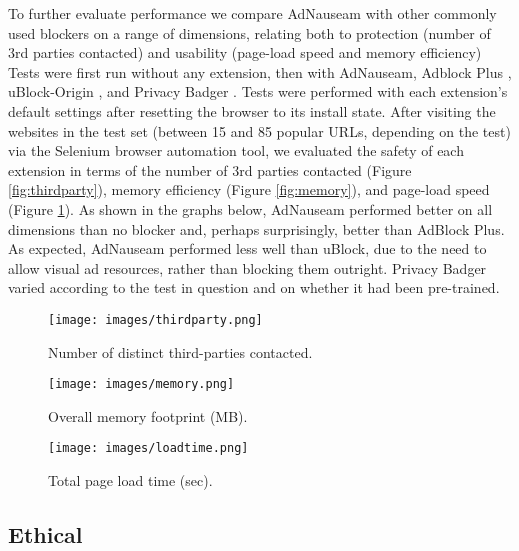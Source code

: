 \documentclass[conference]{IEEEtran}
\begin{document}
To further evaluate performance we compare AdNauseam with other commonly used blockers on a range of dimensions, relating both to protection (number of 3rd parties contacted) and usability (page-load speed and memory efficiency) Tests were first run without any extension, then with AdNauseam, Adblock Plus \cite{AdBlock}, uBlock-Origin \cite{Gorhill}, and Privacy Badger \cite{EFF-0}. Tests were performed with each extension's default settings after resetting the browser to its install state. After visiting the websites in the test set (between 15 and 85 popular URLs, depending on the test) via the Selenium browser automation tool, we evaluated the safety of each extension in terms of the number of 3rd parties contacted (Figure \ref{fig:thirdparty}), memory efficiency (Figure \ref{fig:memory}), and page-load speed (Figure \ref{fig:loadtime}). As shown in the graphs below, AdNauseam performed better on all dimensions than no blocker and, perhaps surprisingly, better than AdBlock Plus. As expected, AdNauseam performed less well than uBlock, due to the need to allow visual ad resources, rather than blocking them outright. Privacy Badger varied according to the test in question and on whether it had been pre-trained.

\begin{figure}[!t]
\centering
\texttt{[image: images/thirdparty.png]}
\caption{Number of distinct third-parties contacted.}
\label{fig:thirdparty}
\vspace{6mm}
\texttt{[image: images/memory.png]}
\caption{Overall memory footprint (MB).}
\label{fig:memory}
\vspace{6mm}
\texttt{[image: images/loadtime.png]}
\caption{Total page load time (sec).}
\label{fig:loadtime}
\end{figure}


\subsection{Ethical}
\end{document}
